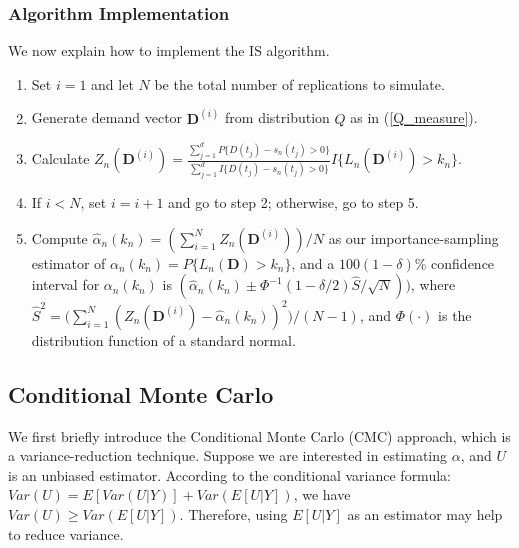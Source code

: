 \documentclass[final,11pt,3p]{article}\usepackage{setspace}
\begin{document}
\subsubsection{Algorithm Implementation}
\label{sec:IS_algo}

We now explain how to implement the IS algorithm.

\begin{enumerate}

\item Set $i = 1$ and let $N$ be the total number of replications to simulate.

\item Generate demand vector $\boldsymbol{D}^{(i)}$ from distribution $Q$ as
in (\ref{Q_measure}). {{}}

\item Calculate $Z_{n}(\boldsymbol{D}^{(i)})= \frac{\sum_{j=1}^{d}P\{D(t_{j})
- s_n(t_{j}) > 0\}}{\sum_{j=1}^{d} I\{D(t_{j}) - s_n(t_{j}) > 0 \} }I\{L_{n}(\boldsymbol{D}^{(i)}) > k_n\}$.

\item If $i < N$, set $i = i+1$ and go to step 2; otherwise, go to step 5.

\item Compute $\widehat{\alpha}_{n}(k_n)= (\sum_{i=1}^{N} Z_{n}(\boldsymbol{D}^{(i)}))/N$ as our importance-sampling estimator of $\alpha_{n}(k_n) =
P\{L_{n}(\boldsymbol{D}) > k_n\}$, and a $100(1-\delta)\%$ confidence interval
for $\alpha_{n}(k_n)$ is $(\widehat{\alpha}_{n}(k_n) \pm\Phi^{-1}(1-\delta/2)
\widehat{S}/\sqrt{N}))$, where $\widehat{S}^{2} = \big(\sum_{i=1}^{N}
(Z_{n}(\boldsymbol{D}^{(i)}) - \widehat{\alpha}_{n}(k_n))^{2}\big)/(N-1)$, and
$\Phi(\cdot)$ is the distribution function of a standard normal.
\end{enumerate}

\subsection{Conditional Monte Carlo} \label{sec:CMC}
We first briefly introduce the Conditional Monte Carlo (CMC) approach, which is a variance-reduction technique. Suppose we are interested in estimating $\alpha$, and $U$ is an unbiased estimator. According to the conditional variance formula:
$Var(U) = E[Var(U|Y)]+Var(E[U|Y])$, we have $Var(U) \ge Var(E[U|Y])$. Therefore,  using $E[U|Y]$ as an estimator may help to reduce variance. 
\end{document}
